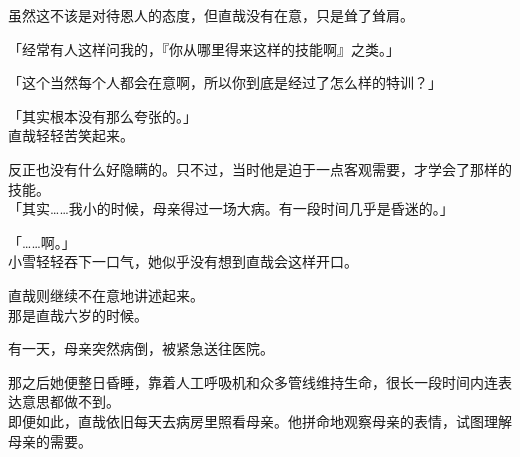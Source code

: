 虽然这不该是对待恩人的态度，但直哉没有在意，只是耸了耸肩。

「经常有人这样问我的，『你从哪里得来这样的技能啊』之类。」

「这个当然每个人都会在意啊，所以你到底是经过了怎么样的特训？」

「其实根本没有那么夸张的。」\\

直哉轻轻苦笑起来。

反正也没有什么好隐瞒的。只不过，当时他是迫于一点客观需要，才学会了那样的技能。\\

「其实……我小的时候，母亲得过一场大病。有一段时间几乎是昏迷的。」

「……啊。」\\

小雪轻轻吞下一口气，她似乎没有想到直哉会这样开口。

直哉则继续不在意地讲述起来。\\

那是直哉六岁的时候。

有一天，母亲突然病倒，被紧急送往医院。

那之后她便整日昏睡，靠着人工呼吸机和众多管线维持生命，很长一段时间内连表达意思都做不到。\\

即便如此，直哉依旧每天去病房里照看母亲。他拼命地观察母亲的表情，试图理解母亲的需要。\\

